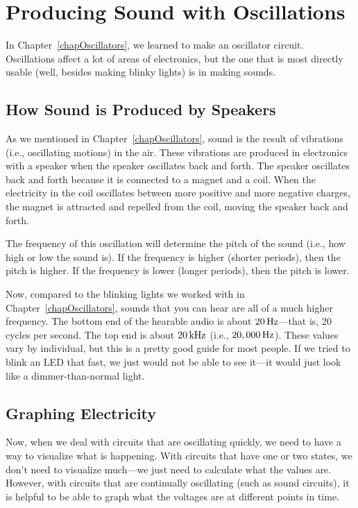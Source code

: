 \chapter{Producing Sound with Oscillations}
\label{chapSound}

In Chapter~\ref{chapOscillators}, we learned to make an oscillator circuit.
Oscillations affect a lot of areas of electronics, but the one that is most directly usable (well, besides making blinky lights) is in making sounds.

\section{How Sound is Produced by Speakers}

As we mentioned in Chapter~\ref{chapOscillators}, sound is the result of vibrations (i.e., oscillating motions) in the air.
These vibrations are produced in electronics with a speaker when the speaker oscillates back and forth.
The speaker oscillates back and forth because it is connected to a magnet and a coil.
When the electricity in the coil oscillates between more positive and more negative charges, the magnet is attracted and repelled from the coil, moving the speaker back and forth.

The frequency of this oscillation will determine the pitch of the sound (i.e., how high or low the sound is).
If the frequency is higher (shorter periods), then the pitch is higher.
If the frequency is lower (longer periods), then the pitch is lower.

Now, compared to the blinking lights we worked with in Chapter~\ref{chapOscillators}, sounds that you can hear are all of a much higher frequency.
The bottom end of the hearable audio is about $20\,\si{\hertz}$---that is, 20 cycles per second.
The top end is about $20\,\si{\kilo\hertz}$ (i.e., $20,000\,\si{\hertz}$).
These values vary by individual, but this is a pretty good guide for most people.
If we tried to blink an LED that fast, we just would not be able to see it---it would just look like a dimmer-than-normal light.

\section{Graphing Electricity}

Now, when we deal with circuits that are oscillating quickly, we need to have a way to visualize what is happening.
With circuits that have one or two states, we don't need to visualize much---we just need to calculate what the values are.
However, with circuits that are continually oscillating (such as sound circuits), it is helpful to be able to graph what the voltages are at different points in time.

